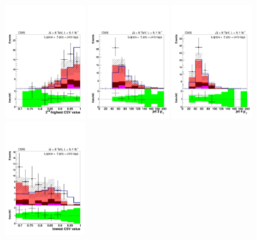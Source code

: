 \begin{figure}[hbtp]
 \begin{center}
   \includegraphics[width=0.31\textwidth]{Figures/Analysis_1_Diagrams/d2MCPlots_second_highest_btag_cut8_j5_tge4_Combined_HtWgt.pdf}
   \includegraphics[width=0.31\textwidth]{Figures/Analysis_1_Diagrams/d2MCPlots_third_jet_pt_cut8_j5_tge4_Combined_HtWgt.pdf}
   \includegraphics[width=0.31\textwidth]{Figures/Analysis_1_Diagrams/d2MCPlots_fourth_jet_pt_cut8_j5_tge4_Combined_HtWgt.pdf}
   \includegraphics[width=0.31\textwidth]{Figures/Analysis_1_Diagrams/d2MCPlots_lowest_btag_cut8_j5_tge4_Combined_HtWgt.pdf}

\end{center}
\end{figure}
